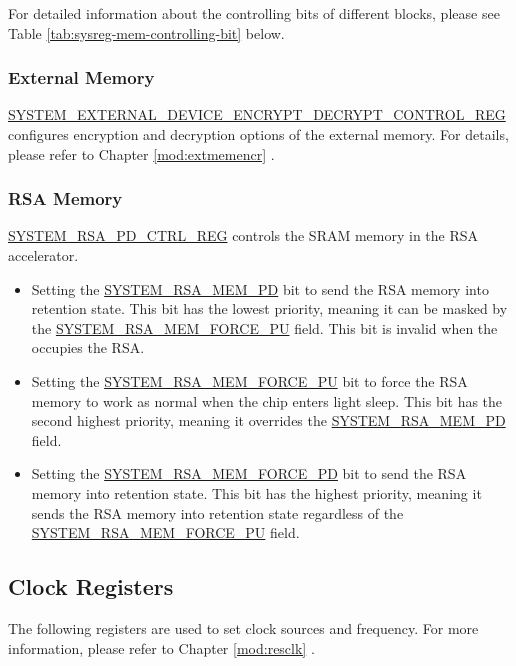 \documentclass[main\_\_EN.tex]{subfiles}
\begin{document}
For detailed information about the controlling bits of different blocks, please see Table \ref{tab:sysreg-mem-controlling-bit} below.

\subsubsection{External Memory}

\hyperref[regdesc:SYSTEMEXTERNALDEVICEENCRYPTDECRYPTCONTROLREG]{SYSTEM\_EXTERNAL\_DEVICE\_ENCRYPT\_DECRYPT\_CONTROL\_REG} configures encryption and decryption options of the external memory. For details, please refer to Chapter \ref{mod:extmemencr}
\textit{}.

\subsubsection{RSA Memory}

\hyperref[regdesc:SYSTEMRSAPDCTRLREG]{SYSTEM\_RSA\_PD\_CTRL\_REG} controls the SRAM memory in the RSA accelerator.

\begin{itemize}
    \item Setting the \hyperref[fielddesc:SYSTEMRSAMEMPD]{SYSTEM\_RSA\_MEM\_PD} bit to send the RSA memory into retention state. This bit has the lowest priority, meaning it can be masked by the \hyperref[fielddesc:SYSTEMRSAMEMFORCEPU]{SYSTEM\_RSA\_MEM\_FORCE\_PU} field. This bit is invalid when the \textit{} occupies the RSA.
    \item Setting the \hyperref[fielddesc:SYSTEMRSAMEMFORCEPU]{SYSTEM\_RSA\_MEM\_FORCE\_PU} bit to force the RSA memory to work as normal when the chip enters light sleep. This bit has the second highest priority, meaning it overrides the \hyperref[fielddesc:SYSTEMRSAMEMPD]{SYSTEM\_RSA\_MEM\_PD} field.
    \item Setting the \hyperref[fielddesc:SYSTEMRSAMEMFORCEPD]{SYSTEM\_RSA\_MEM\_FORCE\_PD} bit to send the RSA memory into retention state. This bit has the highest priority, meaning it sends the RSA memory into retention state regardless of the \hyperref[fielddesc:SYSTEMRSAMEMFORCEPU]{SYSTEM\_RSA\_MEM\_FORCE\_PU} field.
\end{itemize}

\subsection{Clock Registers}

The following registers are used to set clock sources and frequency. For more information, please refer to Chapter \ref{mod:resclk}
\textit{}.
\end{document}
